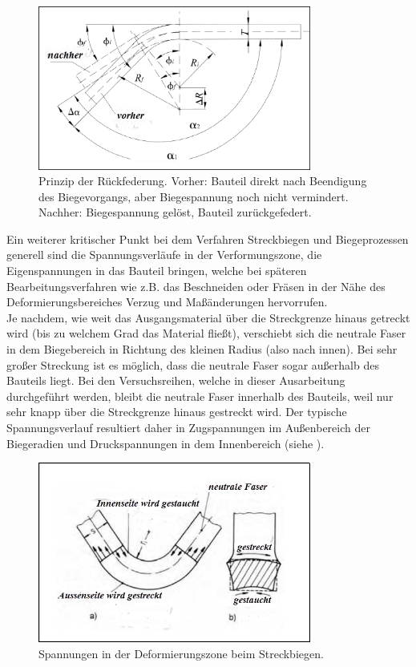 \documentclass[12pt,a4paper,parskip,twoside,BCOR5mm,headsepline]{scrartcl}
\begin{document}
 \begin{figure}[hbtp]
 \centering
 \includegraphics[width=0.8\textwidth]{springback}
 \caption[Rückfederung]{Prinzip der Rückfederung. Vorher: Bauteil direkt nach Beendigung des Biegevorgangs, aber Biegespannung noch nicht vermindert.
 Nachher: Biegespannung gelöst, Bauteil zurückgefedert.\\\autocite[65]{smfpd}}
 \label{fig:springback}
 \end{figure}

Ein weiterer kritischer Punkt bei dem Verfahren Streckbiegen und Biegeprozessen generell sind die Spannungsverläufe in der Verformungszone, die Eigenspannungen in das Bauteil bringen, welche bei späteren Bearbeitungsverfahren wie z.B. das Beschneiden oder Fräsen in der Nähe des Deformierungsbereiches Verzug und Maßänderungen hervorrufen.\\ Je nachdem, wie weit das Ausgangsmaterial über die Streckgrenze hinaus getreckt wird (bis zu welchem Grad das Material fließt), verschiebt sich die neutrale Faser in dem Biegebereich in Richtung des kleinen Radius (also nach innen). Bei sehr großer Streckung ist es möglich, dass die neutrale Faser sogar außerhalb des Bauteils liegt. \autocite[374]{fu} Bei den Versuchsreihen, welche in dieser Ausarbeitung durchgeführt werden, bleibt die neutrale Faser innerhalb des Bauteils, weil nur sehr knapp über die Streckgrenze hinaus gestreckt wird. Der typische Spannungsverlauf resultiert daher in Zugspannungen im Außenbereich der Biegeradien und Druckspannungen in dem Innenbereich (siehe ).

\begin{figure}[hbtp]
\centering
\includegraphics[width=0.8\textwidth]{neutralefaser}
\caption{Spannungen in der Deformierungszone beim Streckbiegen. \autocite[195]{tsch}}
\label{fig:neutralefaser}
\end{figure}
\end{document}
